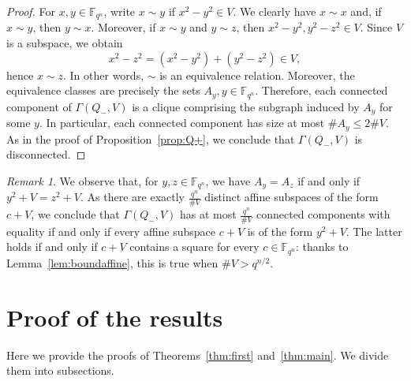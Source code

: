 \documentclass[11pt]{amsart}
\newcommand{\F}{\mathbb F}
\theoremstyle{definition}
\theoremstyle{remark}
\newtheorem{remark}[theorem]{Remark}
\begin{document}
\begin{proof}
For $x, y\in \F_{q^n}$, write $x\sim y$ if $x^2-y^2\in V$. We clearly have $x\sim x$ and, if $x\sim y$, then $y\sim x$. Moreover, if $x\sim y$ and $y\sim z$, then 
$x^2-y^2, y^2-z^2\in V$. Since $V$ is a subspace, we obtain
$$x^2-z^2=(x^2-y^2)+(y^2-z^2)\in V,$$
hence $x\sim z$. In other words, $\sim$ is an equivalence relation. Moreover, the equivalence classes are precisely the sets $A_y, y\in \F_{q^n}$. 
Therefore, each connected component of $\Gamma(Q_-, V)$ is a clique comprising the subgraph induced by $A_y$ for some $y$. In particular, each connected component has size at most $\# A_y\le 2\# V$. As in the proof of Proposition~\ref{prop:Q+}, we conclude that $\Gamma(Q_-, V)$ is disconnected.  
\end{proof}

\begin{remark}\label{rem:Q-}
 We observe that, for $y, z\in \F_{q^n}$, we have $A_y=A_z$ if and only if $y^2+V=z^2+V$. As there are exactly $\frac{q^n}{\# V}$ distinct affine subspaces of the form $c+V$, we conclude that $\Gamma(Q_-, V)$ has at most $\frac{q^n}{\# V}$ connected components with equality if and only if every affine subspace $c+V$ is of the form $y^2+V$. The latter holds if and only if $c+V$ contains a square for every $c\in \F_{q^n}$: thanks to Lemma~\ref{lem:boundaffine}, this is true when $\# V> q^{n/2}$.
\end{remark}

\section{Proof of the results}
Here we provide the proofs of Theorems~\ref{thm:first} and~\ref{thm:main}. We divide them into subsections.
\end{document}
